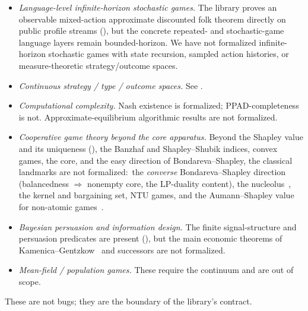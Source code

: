 \begin{itemize}\itemsep2pt
\item \emph{Language-level infinite-horizon stochastic games.}
The library proves an observable mixed-action approximate
discounted folk theorem directly on public  profile
streams (), but the concrete repeated-
and stochastic-game language layers remain bounded-horizon.  We
have not formalized infinite-horizon stochastic games with state
recursion, sampled action histories, or measure-theoretic
strategy/outcome spaces.

\item \emph{Continuous strategy / type / outcome spaces.}  See
.

\item \emph{Computational complexity.}  Nash existence is
formalized; PPAD-completeness~\citep{DaskalakisGoldbergPapadimitriou2009}
is not.  Approximate-equilibrium algorithmic results are not
formalized.

\item \emph{Cooperative game theory beyond the core apparatus.}
Beyond the Shapley value and its uniqueness (),
the Banzhaf and Shapley–Shubik indices, convex games, the core, and
the easy direction of Bondareva–Shapley, the classical landmarks are
not formalized:\ the \emph{converse} Bondareva–Shapley direction
(balancedness $\Rightarrow$ nonempty core, the LP-duality content),
the nucleolus~\citep{Schmeidler1969}, the kernel and bargaining set,
NTU games, and the Aumann–Shapley value for non-atomic
games~\citep{AumannShapley1974}.

\item \emph{Bayesian persuasion and information design.}
The finite signal-structure and persuasion predicates are present
(), but the main economic theorems of
Kamenica–Gentzkow~\citep{KamenicaGentzkow2011} and successors
are not formalized.

\item \emph{Mean-field / population games.}  These require the
continuum and are out of scope.
\end{itemize}

These are not bugs; they are the boundary of the library's
contract.
